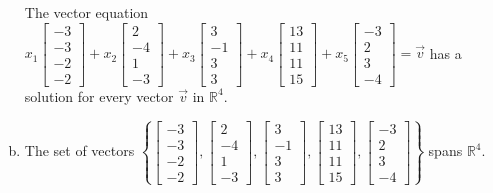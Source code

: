 \begin{exerciseAnswer}
\begin{enumerate}[(a)]
\begin{center}\begin{minipage}{0.8\textwidth}
 The vector equation \( x_{1} \left[\begin{array}{c}
-3 \\
-3 \\
-2 \\
-2
\end{array}\right] + x_{2} \left[\begin{array}{c}
2 \\
-4 \\
1 \\
-3
\end{array}\right] + x_{3} \left[\begin{array}{c}
3 \\
-1 \\
3 \\
3
\end{array}\right] + x_{4} \left[\begin{array}{c}
13 \\
11 \\
11 \\
15
\end{array}\right] + x_{5} \left[\begin{array}{c}
-3 \\
2 \\
3 \\
-4
\end{array}\right] =\vec{v}\) has a solution for every vector \(\vec{v}\) in \(\mathbb{R}^4\). 
\end{minipage}\end{center}
    
\item  The set of vectors \( \left\{ \left[\begin{array}{c}
-3 \\
-3 \\
-2 \\
-2
\end{array}\right] , \left[\begin{array}{c}
2 \\
-4 \\
1 \\
-3
\end{array}\right] , \left[\begin{array}{c}
3 \\
-1 \\
3 \\
3
\end{array}\right] , \left[\begin{array}{c}
13 \\
11 \\
11 \\
15
\end{array}\right] , \left[\begin{array}{c}
-3 \\
2 \\
3 \\
-4
\end{array}\right] \right\} \) spans \(\mathbb{R}^4\). 
\end{enumerate}
    
\end{exerciseAnswer}
    
